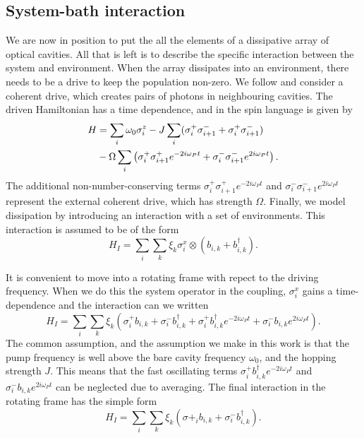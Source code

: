 \documentclass[11pt,a4paper,article,oneside]{memoir}
\begin{document}
\subsection{System-bath interaction}
We are now in position to put the all the elements of a dissipative
array of optical cavities. All that is left is to describe the
specific interaction between the system and environment. When the
array dissipates into an environment, there needs to be a drive to
keep the population non-zero. We follow \cite{Biella2015, Genway2014,
  Joshi2013} and consider a coherent drive, which creates pairs of
photons in neighbouring cavities. The driven Hamiltonian has a time
dependence, and in the spin language is given by
\begin{align}
  H&=\sum_i\omega_0 \sigma^z_i -J \sum_i
  (\sigma^+_i\sigma^-_{i+1}+\sigma^+_i\sigma^-_{i+1})
  \notag\\ &-\Omega\sum_i\left(\sigma^+_i\sigma^+_{i+1}
  e^{-2i\omega_Pt}+\sigma^-_i\sigma^-_{i+1}e^{2i\omega_Pt}\right).
\end{align}
The additional non-number-conserving terms
$\sigma^+_i\sigma^+_{i+1}e^{-2i\omega_Pt}$ and
$\sigma^-_i\sigma^-_{i+1}e^{2i\omega_Pt}$ represent the external
coherent drive, which has strength $\Omega$. Finally, we model
dissipation by introducing an interaction with a set of
environments. This interaction is assumed to be of the form
\begin{equation}
  H_I=\sum_i \sum_k \xi_k \sigma^x_i \otimes (b_{i,k}+b^\dagger_{i,k}).
\end{equation}
\par It is convenient to move into a rotating frame with repect to the
driving frequency. When we do this the system operator in the
coupling, $\sigma^x_i$ gains a time-dependence and the interaction can
we written
\begin{equation}
  H_I=\sum_i \sum_k
  \xi_k\left(\sigma^+_ib_{i,k}+\sigma^-_ib^\dagger_{i,k}+\sigma^+_ib^\dagger_{i,k}e^{-2i\omega_Pt}+\sigma^-_ib_{i,k}e^{2i\omega_Pt}\right).
\end{equation}
The common assumption, and the assumption we make in this work is that
the pump frequency is well above the bare cavity frequency $\omega_0$,
and the hopping strength $J$. This means that the fast oscillating
terms $\sigma^+_ib^\dagger_{i,k}e^{-2i\omega_Pt}$ and
$\sigma^-_ib_{i,k}e^{2i\omega_Pt}$ can be neglected due to
averaging. The final interaction in the rotating frame has the simple
form
\begin{equation}
  H_I = \sum_i \sum_k \xi_k (\sigma+_ib_{i,k}+\sigma^-_ib^\dagger_{i,k}).
\end{equation}
\end{document}
